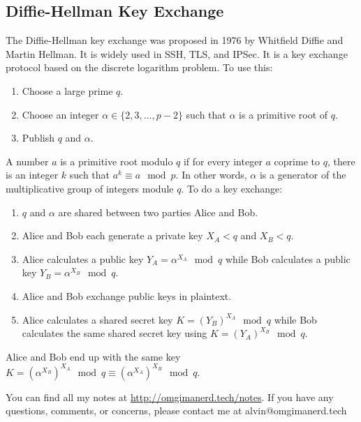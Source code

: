 \documentclass{math}
\begin{document}
\subsection*{Diffie-Hellman Key Exchange}
The Diffie-Hellman key exchange was proposed in 1976 by Whitfield Diffie and
Martin Hellman. It is widely used in SSH, TLS, and IPSec. It is a key
exchange protocol based on the discrete logarithm problem. To use this:
\begin{enumerate}
  \item Choose a large prime \( q \).
  \item Choose an integer \( \alpha\in\{2,3,\dots,p-2\} \) such that
  \( \alpha \) is a primitive root of \( q \).
  \item Publish \( q \) and \( \alpha \).
\end{enumerate}
A number \( a \) is a primitive root modulo \( q \) if for every integer \( a \)
coprime to \( q \), there is an integer \( k \) such that \( a^k\equiv a\mod p
\). In other words, \( \alpha \) is a generator of the multiplicative group of
integers module \( q \). To do a key exchange:
\begin{enumerate}
  \item \( q \) and \( \alpha \) are shared between two parties Alice and Bob.
  \item Alice and Bob each generate a private key \( X_A < q \) and
  \( X_B < q \).
  \item Alice calculates a public key \( Y_A = \alpha^{X_A}\mod q \) while Bob
  calculates a public key \( Y_B = \alpha^{X_B}\mod q \).
  \item Alice and Bob exchange public keys in plaintext.
  \item Alice calculates a shared secret key \( K = (Y_B)^{X_A}\mod q \) while
  Bob calculates the same shared secret key using \( K = (Y_A)^{X_B}\mod q \).
\end{enumerate}
Alice and Bob end up with the same key \( K = (\alpha^{X_B})^{X_A}\mod q \equiv
(\alpha^{X_A})^{X_B}\mod q \).

\begin{center}
  You can find all my notes at \url{http://omgimanerd.tech/notes}. If you have
  any questions, comments, or concerns, please contact me at
  alvin@omgimanerd.tech
\end{center}
\end{document}
